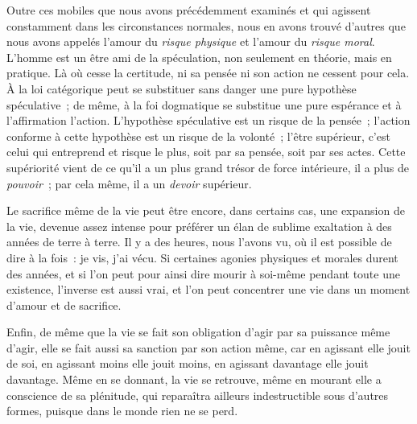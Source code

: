 \documentclass[french,twoside]{book} %
\begin{document}
Outre ces mobiles que nous avons précédemment examinés et qui agissent constamment dans les circonstances normales, nous en avons trouvé d’autres que nous avons appelés l’amour du \emph{risque physique} et l’amour du \emph{risque moral}. L’homme est un être ami de la spéculation, non seulement en théorie, mais en pratique. Là où cesse la certitude, ni sa pensée ni son action ne cessent pour cela. À la loi catégorique peut se substituer sans danger une pure hypothèse spéculative ; de même, à la foi dogmatique se substitue une pure espérance et à l’affirmation l’action. L’hypothèse spéculative est un risque de la pensée ; l’action conforme à cette hypothèse est un risque de la volonté ; l’être supérieur, c’est celui qui entreprend et risque le plus, soit par sa pensée, soit par ses actes. Cette supériorité vient de ce qu’il a un plus grand trésor de force intérieure, il a plus de \emph{pouvoir} ; par cela même, il a un \emph{devoir} supérieur.\par
Le sacrifice même de la vie peut être encore, dans certains cas, une expansion de la vie, devenue assez intense pour préférer un élan de sublime exaltation à des années de terre à terre. Il y a des heures, nous l’avons vu, où il est possible de dire à la fois : je vis, j’ai vécu. Si certaines agonies physiques et morales durent des années, et si l’on peut pour ainsi dire mourir à soi-même pendant toute une existence, l’inverse est aussi vrai, et l’on peut concentrer une vie dans un moment d’amour et de sacrifice.\par
Enfin, de même que la vie se fait son obligation d’agir par sa puissance même d’agir, elle se fait aussi sa sanction par son action même, car en agissant elle jouit de soi, en agissant moins elle jouit moins, en agissant davantage elle jouit davantage. Même en se donnant, la vie se retrouve, même en mourant elle a conscience de sa plénitude, qui reparaîtra ailleurs indestructible sous d’autres formes, puisque dans le monde rien ne se perd.\par
\end{document}
